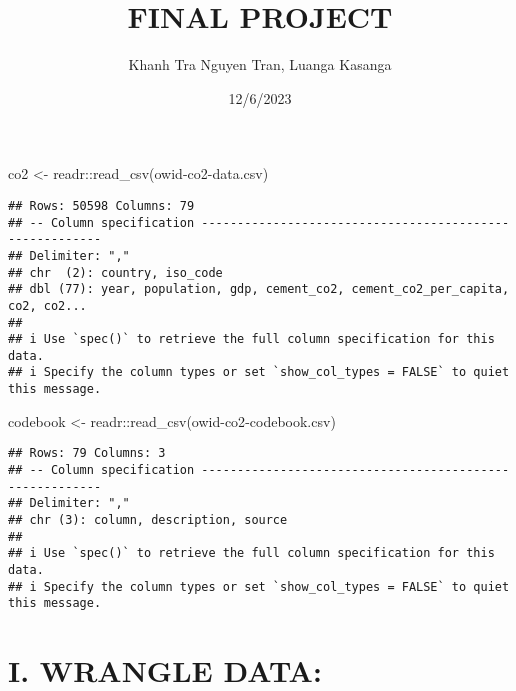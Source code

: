 \documentclass[
]{article}
\title{FINAL PROJECT}
\author{Khanh Tra Nguyen Tran, Luanga Kasanga}
\date{12/6/2023}
\newenvironment{Shaded}{\begin{snugshade}}{\end{snugshade}}
\newcommand{\FunctionTok}[1]{\textcolor[rgb]{0.00,0.00,0.00}{#1}}
\newcommand{\NormalTok}[1]{#1}
\newcommand{\OtherTok}[1]{\textcolor[rgb]{0.56,0.35,0.01}{#1}}
\newcommand{\SpecialCharTok}[1]{\textcolor[rgb]{0.00,0.00,0.00}{#1}}
\newcommand{\StringTok}[1]{\textcolor[rgb]{0.31,0.60,0.02}{#1}}
\begin{document}
\maketitle

\begin{Shaded}
\begin{Highlighting}[]
\NormalTok{co2 }\OtherTok{\textless{}{-}}\NormalTok{ readr}\SpecialCharTok{::}\FunctionTok{read\_csv}\NormalTok{(}\StringTok{\textquotesingle{}owid{-}co2{-}data.csv\textquotesingle{}}\NormalTok{)}
\end{Highlighting}
\end{Shaded}

\begin{verbatim}
## Rows: 50598 Columns: 79
## -- Column specification --------------------------------------------------------
## Delimiter: ","
## chr  (2): country, iso_code
## dbl (77): year, population, gdp, cement_co2, cement_co2_per_capita, co2, co2...
## 
## i Use `spec()` to retrieve the full column specification for this data.
## i Specify the column types or set `show_col_types = FALSE` to quiet this message.
\end{verbatim}

\begin{Shaded}
\begin{Highlighting}[]
\NormalTok{codebook }\OtherTok{\textless{}{-}}\NormalTok{  readr}\SpecialCharTok{::}\FunctionTok{read\_csv}\NormalTok{(}\StringTok{\textquotesingle{}owid{-}co2{-}codebook.csv\textquotesingle{}}\NormalTok{)}
\end{Highlighting}
\end{Shaded}

\begin{verbatim}
## Rows: 79 Columns: 3
## -- Column specification --------------------------------------------------------
## Delimiter: ","
## chr (3): column, description, source
## 
## i Use `spec()` to retrieve the full column specification for this data.
## i Specify the column types or set `show_col_types = FALSE` to quiet this message.
\end{verbatim}

\hypertarget{i.-wrangle-data}{%
\section{I. WRANGLE DATA:}\label{i.-wrangle-data}}
\end{document}
